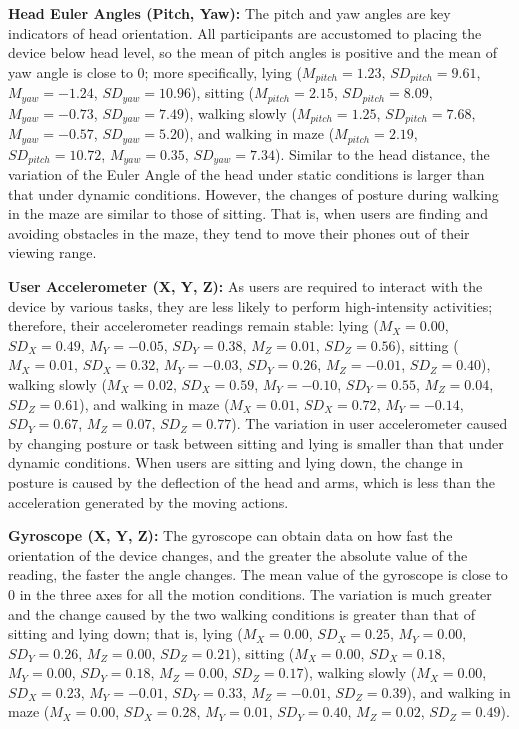 \noindent\textbf{Head Euler Angles (Pitch, Yaw):}  The pitch and yaw angles are key indicators of head orientation. All participants are accustomed to placing the device below head level, so the mean of pitch angles is positive and the mean of yaw angle is close to 0; more specifically, lying ($M_{pitch} = 1.23$, $SD_{pitch} = 9.61$, $M_{yaw} = -1.24$, $SD_{yaw} = 10.96$), sitting ($M_{pitch} = 2.15$, $SD_{pitch} = 8.09$, $M_{yaw} = -0.73$, $SD_{yaw} = 7.49$), walking slowly ($M_{pitch} = 1.25$, $SD_{pitch} = 7.68$, $M_{yaw} = -0.57$, $SD_{yaw} = 5.20$), and walking in maze ($M_{pitch} = 2.19$, $SD_{pitch} = 10.72$, $M_{yaw} = 0.35$, $SD_{yaw} = 7.34$). Similar to the head distance, the variation of the Euler Angle of the head under static conditions is larger than that under dynamic conditions. However, the changes of posture during walking in the maze are similar to those of sitting. That is, when users are finding and avoiding obstacles in the maze, they tend to move their phones out of their viewing range. 


\noindent\textbf{User Accelerometer (X, Y, Z):}  As users are required to interact with the device by various tasks, they are less likely to perform high-intensity activities; therefore, their accelerometer readings remain stable: lying ($M_{X} = 0.00$, $SD_{X} =0.49 $, $M_{Y} = -0.05$, $SD_{Y} = 0.38$, $M_{Z} = 0.01$, $SD_{Z} = 0.56$), sitting ($M_{X} = 0.01$, $SD_{X} = 0.32$, $M_{Y} = -0.03$, $SD_{Y} = 0.26$, $M_{Z} = -0.01$, $SD_{Z} = 0.40$), walking slowly ($M_{X} = 0.02$, $SD_{X} = 0.59$, $M_{Y} = -0.10$, $SD_{Y} = 0.55$, $M_{Z} = 0.04$, $SD_{Z} = 0.61$), and walking in maze ($M_{X} = 0.01$, $SD_{X} = 0.72$, $M_{Y} = -0.14$, $SD_{Y} = 0.67$, $M_{Z} = 0.07$, $SD_{Z} = 0.77$). The variation in user accelerometer caused by changing posture or task between sitting and lying is smaller than that under dynamic conditions. When users are sitting and lying down, the change in posture is caused by the deflection of the head and arms, which is less than the acceleration generated by the moving actions.


\noindent\textbf{Gyroscope (X, Y, Z):} The gyroscope can obtain data on how fast the orientation of the device changes, and the greater the absolute value of the reading, the faster the angle changes. The mean value of the gyroscope is close to 0 in the three axes for all the motion conditions. The variation is much greater and the change caused by the two walking conditions is greater than that of sitting and lying down; that is, lying ($M_{X} = 0.00$, $SD_{X} = 0.25$, $M_{Y} = 0.00$, $SD_{Y} = 0.26$, $M_{Z} = 0.00$, $SD_{Z} = 0.21$), sitting ($M_{X} = 0.00$, $SD_{X} = 0.18$, $M_{Y} = 0.00$, $SD_{Y} = 0.18$, $M_{Z} = 0.00$, $SD_{Z} = 0.17$), walking slowly ($M_{X} = 0.00$, $SD_{X} = 0.23$, $M_{Y} = -0.01$, $SD_{Y} = 0.33$, $M_{Z} = -0.01$, $SD_{Z} = 0.39$), and walking in maze ($M_{X} = 0.00$, $SD_{X} = 0.28$, $M_{Y} = 0.01$, $SD_{Y} = 0.40$, $M_{Z} = 0.02$, $SD_{Z} = 0.49$).

